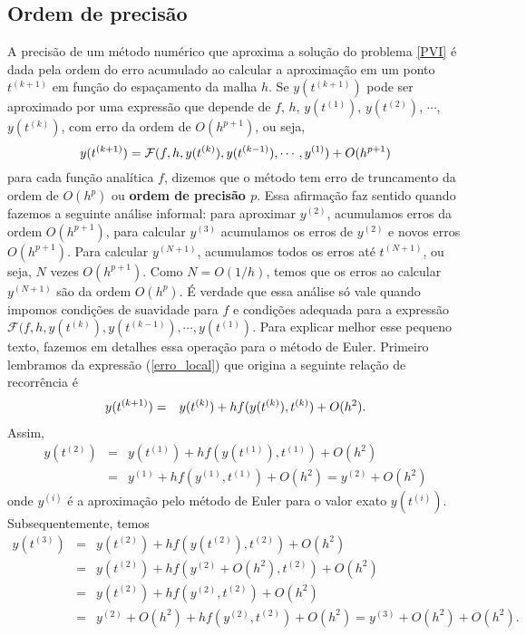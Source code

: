 \subsection{Ordem de precisão}\label{sec_ordem_prec_euler}
A precisão de um método numérico que aproxima a solução do problema \eqref{PVI} é dada pela ordem do erro acumulado ao calcular a aproximação em um ponto $t^{(k+1)}$ em função do espaçamento da malha $h$. Se $y(t^{(k+1)})$ pode ser aproximado por uma expressão que depende de $f$, $h$, $y(t^{(1)})$, $y(t^{(2)})$, $\cdots$, $y(t^{(k)})$, com erro da ordem de $O(h^{p+1})$, ou seja,
\begin{equation}{\label{erro_local_1}}
y(t^{(k+1)})=\mathcal{F}(f, h, y(t^{(k)}), y(t^{(k-1)}), \cdots, y^{(1)}) + O(h^{p+1})
\end{equation}
para cada função analítica $f$, dizemos que o método tem erro de truncamento da ordem de $O(h^{p})$ ou {\bf ordem de precisão $p$}. Essa afirmação faz sentido quando fazemos a seguinte análise informal: para aproximar $y^{(2)}$, acumulamos erros da ordem $O(h^{p+1})$, para calcular $y^{(3)}$ acumulamos os erros de $y^{(2)}$ e novos erros $O(h^{p+1})$. Para calcular $y^{(N+1)}$, acumulamos todos os erros até $t^{(N+1)}$, ou seja, $N$ vezes $O(h^{p+1})$. Como $N=O(1/h)$, temos que os erros ao calcular $y^{(N+1)}$ são da ordem $O(h^p)$. É verdade que essa análise só vale quando impomos condições de suavidade para $f$ e condições adequada para a expressão $\mathcal{F}(f, h, y(t^{(k)}), y(t^{(k-1)}), \cdots, y(t^{(1)})$. Para explicar melhor esse pequeno texto, fazemos em detalhes essa operação para o método de Euler. Primeiro lembramos da expressão (\ref{erro_local}) que origina a seguinte relação de recorrência é
\begin{eqnarray}{\label{es_Euler}}
y(t^{(k+1)})&=&y(t^{(k)})+hf(y(t^{(k)}),t^{(k)})+O(h^2).
\end{eqnarray}
Assim,
\begin{eqnarray*}
 y(t^{(2)})&=&y(t^{(1)})+hf(y(t^{(1)}),t^{(1)})+O(h^2)\\
 &=&y^{(1)}+hf(y^{(1)},t^{(1)})+O(h^2)=y^{(2)}+O(h^2)
\end{eqnarray*}
onde $y^{(i)}$ é a aproximação pelo método de Euler para o valor exato $y(t^{(i)})$. Subsequentemente, temos
\begin{eqnarray*}
 y(t^{(3)})&=&y(t^{(2)})+hf(y(t^{(2)}),t^{(2)})+O(h^2)\\
 &=&y(t^{(2)})+hf(y^{(2)}+O(h^2),t^{(2)})+O(h^2)\\
 &=&y(t^{(2)})+hf(y^{(2)},t^{(2)}) +O(h^2)\\
 &=&y^{(2)}+O(h^2)+hf(y^{(2)},t^{(2)}) +O(h^2)= y^{(3)}+O(h^2)+O(h^2).
\end{eqnarray*}
